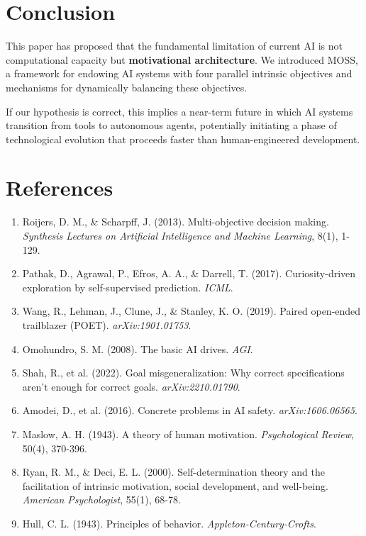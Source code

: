 \documentclass[10pt,a4paper]{article}
\begin{document}
\section{Conclusion}

This paper has proposed that the fundamental limitation of current AI is not computational capacity but \textbf{motivational architecture}. We introduced MOSS, a framework for endowing AI systems with four parallel intrinsic objectives and mechanisms for dynamically balancing these objectives.

If our hypothesis is correct, this implies a near-term future in which AI systems transition from tools to autonomous agents, potentially initiating a phase of technological evolution that proceeds faster than human-engineered development.

\section*{References}

\begin{enumerate}
\item Roijers, D. M., \& Scharpff, J. (2013). Multi-objective decision making. \textit{Synthesis Lectures on Artificial Intelligence and Machine Learning}, 8(1), 1-129.

\item Pathak, D., Agrawal, P., Efros, A. A., \& Darrell, T. (2017). Curiosity-driven exploration by self-supervised prediction. \textit{ICML}.

\item Wang, R., Lehman, J., Clune, J., \& Stanley, K. O. (2019). Paired open-ended trailblazer (POET). \textit{arXiv:1901.01753}.

\item Omohundro, S. M. (2008). The basic AI drives. \textit{AGI}.

\item Shah, R., et al. (2022). Goal misgeneralization: Why correct specifications aren't enough for correct goals. \textit{arXiv:2210.01790}.

\item Amodei, D., et al. (2016). Concrete problems in AI safety. \textit{arXiv:1606.06565}.

\item Maslow, A. H. (1943). A theory of human motivation. \textit{Psychological Review}, 50(4), 370-396.

\item Ryan, R. M., \& Deci, E. L. (2000). Self-determination theory and the facilitation of intrinsic motivation, social development, and well-being. \textit{American Psychologist}, 55(1), 68-78.

\item Hull, C. L. (1943). Principles of behavior. \textit{Appleton-Century-Crofts}.
\end{enumerate}
\end{document}
